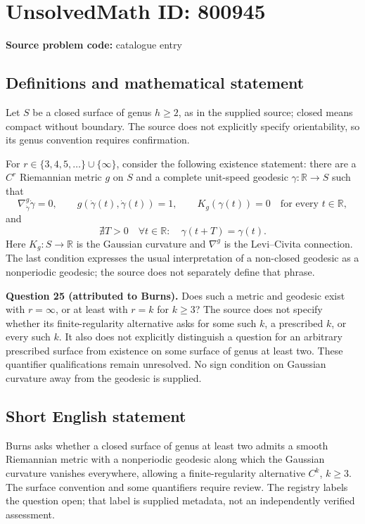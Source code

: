 \documentclass[11pt]{article}
\newcommand{\R}{\mathbb{R}}
\begin{document}
\section*{UnsolvedMath ID: 800945}
\textbf{Source problem code:} catalogue entry
\subsection{Definitions and mathematical statement}
Let \(S\) be a closed surface of genus \(h\ge 2\), as in the supplied source; closed means compact without boundary. The source does not explicitly specify orientability, so its genus convention requires confirmation.

For \(r\in\{3,4,5,\ldots\}\cup\{\infty\}\), consider the following existence statement: there are a \(C^r\) Riemannian metric \(g\) on \(S\) and a complete unit-speed geodesic \(\gamma:\R\to S\) such that
\[
\nabla^{g}_{\dot\gamma}\dot\gamma=0,\qquad
 g(\dot\gamma(t),\dot\gamma(t))=1,\qquad
 K_g(\gamma(t))=0\quad\text{for every }t\in\R,
\]
and
\[
\nexists T>0\quad\forall t\in\R:\quad\gamma(t+T)=\gamma(t).
\]
Here \(K_g:S\to\R\) is the Gaussian curvature and \(\nabla^g\) is the Levi--Civita connection. The last condition expresses the usual interpretation of a non-closed geodesic as a nonperiodic geodesic; the source does not separately define that phrase.

\textbf{Question 25 (attributed to Burns).} Does such a metric and geodesic exist with \(r=\infty\), or at least with \(r=k\) for \(k\ge 3\)? The source does not specify whether its finite-regularity alternative asks for some such \(k\), a prescribed \(k\), or every such \(k\). It also does not explicitly distinguish a question for an arbitrary prescribed surface from existence on some surface of genus at least two. These quantifier qualifications remain unresolved. No sign condition on Gaussian curvature away from the geodesic is supplied.
\subsection{Short English statement}
Burns asks whether a closed surface of genus at least two admits a smooth Riemannian metric with a nonperiodic geodesic along which the Gaussian curvature vanishes everywhere, allowing a finite-regularity alternative \(C^k\), \(k\ge 3\). The surface convention and some quantifiers require review. The registry labels the question open; that label is supplied metadata, not an independently verified assessment.
\end{document}
